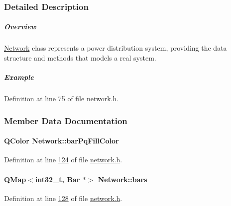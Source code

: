 \subsubsection{Detailed Description}
\subparagraph*{Overview}

\hyperlink{class_network}{Network} class represents a power distribution system, providing the data structure and methods that models a real system.

\subparagraph*{Example}


\begin{DoxyCode}
\end{DoxyCode}
 

Definition at line \hyperlink{network_8h_source_l00075}{75} of file \hyperlink{network_8h_source}{network.\+h}.



\subsubsection{Member Data Documentation}
\hypertarget{class_network_a386f492f548ec13f5d0e350c4f2217aa}{}
\paragraph[{bar\+Pq\+Fill\+Color}]{\setlength{\rightskip}{0pt plus 5cm}Q\+Color Network\+::bar\+Pq\+Fill\+Color}\label{class_network_a386f492f548ec13f5d0e350c4f2217aa}


Definition at line \hyperlink{network_8h_source_l00124}{124} of file \hyperlink{network_8h_source}{network.\+h}.

\hypertarget{class_network_a7fe628f7de34a96235cbd3f2cee4aff2}{}
\paragraph[{bars}]{\setlength{\rightskip}{0pt plus 5cm}Q\+Map$<$int32\+\_\+t, {\bf Bar} $\ast$$>$ Network\+::bars}\label{class_network_a7fe628f7de34a96235cbd3f2cee4aff2}


Definition at line \hyperlink{network_8h_source_l00128}{128} of file \hyperlink{network_8h_source}{network.\+h}.

\hypertarget{class_network_ad78d9a206daf4ba0780067b5043c7f5c}{}
